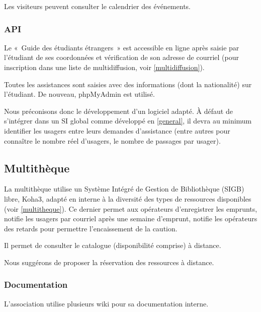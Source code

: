 Les visiteurs peuvent consulter le calendrier des événements.

\subsubsection{API}

Le «~Guide des étudiants étrangers~» est accessible en ligne après saisie par
l'étudiant de ses coordonnées et vérification de son adresse de courriel (pour
inscription dans une liste de multidiffusion, voir \ref{multidiffusion}).

Toutes les assistances sont saisies avec des informations (dont la nationalité)
sur l'étudiant. De nouveau, phpMyAdmin est utilisé.

Nous préconisons donc le développement d'un logiciel adapté. À défaut
de s'intégrer dans un SI global comme développé en \ref{general}, il
devra au minimum identifier les usagers entre leurs demandes d'assistance
(entre autres pour connaître le nombre réel d'usagers, le nombre de passages
par usager).

\subsection{Multithèque}

La multithèque utilise un Système Intégré de Gestion de Bibliothèque (SIGB) libre, Koha3,
adapté en interne à la diversité des types de ressources disponibles (voir \ref{multitheque}).
Ce dernier permet aux opérateurs d'enregistrer les emprunts, notifie les usagers
par courriel après une semaine d'emprunt, notifie les opérateurs des retards pour permettre l'encaissement de la caution.

Il permet de consulter le catalogue (disponibilité comprise) à distance.

Nous suggérons de proposer la réservation des ressources à distance.

\subsubsection{Documentation}

L'association utilise plusieurs wiki pour sa documentation interne.